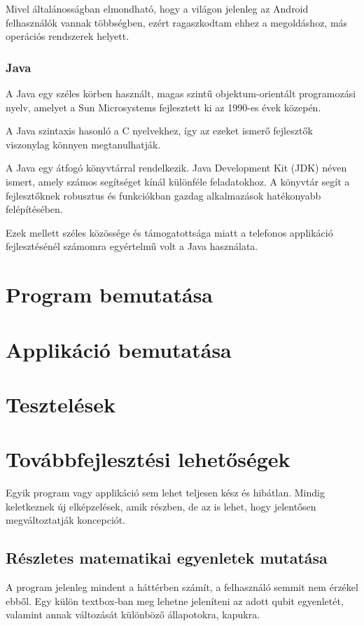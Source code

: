 \documentclass[
]{thesis-ekf}
\theoremstyle{definition}
\theoremstyle{remark}
\begin{document}
Mivel általánosságban elmondható, hogy a világon jelenleg az Android felhasználók vannak többségben, ezért ragaszkodtam ehhez a megoldáshoz, más operációs rendszerek helyett.

\subsubsection{Java}
A Java egy széles körben használt, magas szintű objektum-orientált programozási nyelv, amelyet a Sun Microsystems fejlesztett ki az 1990-es évek közepén. 

A Java szintaxis hasonló a C nyelvekhez, így az ezeket ismerő fejlesztők viszonylag könnyen megtanulhatják. 

A Java egy átfogó könyvtárral rendelkezik. Java Development Kit (JDK) néven ismert, amely számos segítséget kínál különféle feladatokhoz. A könyvtár segít a fejlesztőknek robusztus és funkciókban gazdag alkalmazások hatékonyabb felépítésében.

Ezek mellett széles közössége és támogatottsága miatt a telefonos applikáció fejlesztésénél számomra egyértelmű volt a Java használata.

\section{Program bemutatása}

\section{Applikáció bemutatása}

\section{Tesztelések}

\section{Továbbfejlesztési lehetőségek}
Egyik program vagy applikáció sem lehet teljesen kész és hibátlan. Mindig keletkeznek új elképzelések, amik részben, de az is lehet, hogy jelentősen megváltoztatják koncepciót.
\subsection{Részletes matematikai egyenletek mutatása}
A program jelenleg mindent a háttérben számít, a felhasználó semmit nem érzékel ebből. Egy külön textbox-ban meg lehetne jeleníteni az adott qubit egyenletét, valamint annak változását különböző állapotokra, kapukra.
\end{document}
